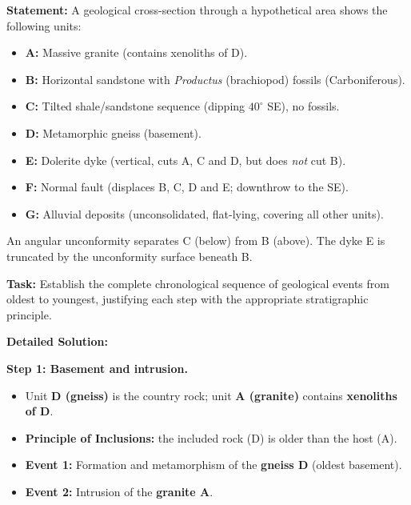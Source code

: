 \documentclass[11pt]{article}
\begin{document}
\begin{exoresolu}
\textbf{Statement:} A geological cross-section through a hypothetical area shows the following units:
\begin{itemize}
    \item \textbf{A:} Massive granite (contains xenoliths of D).
    \item \textbf{B:} Horizontal sandstone with \emph{Productus} (brachiopod) fossils (Carboniferous).
    \item \textbf{C:} Tilted shale/sandstone sequence (dipping $40^\circ$ SE), no fossils.
    \item \textbf{D:} Metamorphic gneiss (basement).
    \item \textbf{E:} Dolerite dyke (vertical, cuts A, C and D, but does \emph{not} cut B).
    \item \textbf{F:} Normal fault (displaces B, C, D and E; downthrow to the SE).
    \item \textbf{G:} Alluvial deposits (unconsolidated, flat-lying, covering all other units).
\end{itemize}
An angular unconformity separates C (below) from B (above). The dyke E is truncated by the unconformity surface beneath B.

\textbf{Task:} Establish the complete chronological sequence of geological events from oldest to youngest, justifying each step with the appropriate stratigraphic principle.

\tcblower
\textbf{Detailed Solution:}

\textbf{Step 1: Basement and intrusion.}
\begin{itemize}
    \item Unit \textbf{D (gneiss)} is the country rock; unit \textbf{A (granite)} contains \textbf{xenoliths of D}.
    \item \textbf{Principle of Inclusions:} the included rock (D) is older than the host (A).
    \item \textbf{Event 1:} Formation and metamorphism of the \textbf{gneiss D} (oldest basement).
    \item \textbf{Event 2:} Intrusion of the \textbf{granite A}.
\end{itemize}


\end{exoresolu}
\end{document}
